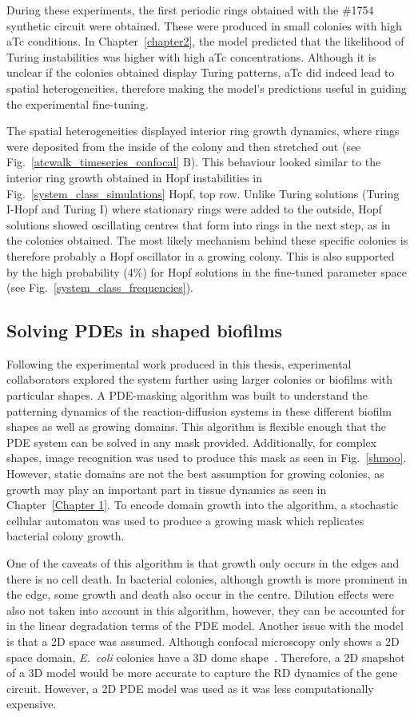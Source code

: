 During these experiments, the first periodic rings obtained with the \#1754 synthetic circuit were obtained.
These were produced in small colonies with high aTc conditions.
In Chapter~\ref{chapter2}, the model predicted that the likelihood of Turing instabilities was higher with high aTc concentrations.
Although it is unclear if the colonies obtained display Turing patterns, aTc did indeed lead to spatial heterogeneities, therefore making the model's predictions useful in guiding the experimental fine-tuning.

The spatial heterogeneities displayed interior ring growth dynamics, where rings were deposited from the inside of the colony and then stretched out (see Fig.~\ref{atcwalk_timeseries_confocal} B).
This behaviour looked similar to the interior ring growth obtained in Hopf instabilities in Fig.~\ref{system_class_simulations} Hopf, top row.
Unlike Turing solutions (Turing I-Hopf and Turing I) where stationary rings were added to the outside, Hopf solutions showed oscillating centres that form into rings in the next step, as in the colonies obtained.
The most likely mechanism behind these specific colonies is therefore probably a Hopf oscillator in a growing colony.
This is also supported by the high probability (4\%) for Hopf solutions in the fine-tuned parameter space (see Fig.~\ref{system_class_frequencies}).

\subsection{Solving PDEs in shaped biofilms}
Following the experimental work produced in this thesis, experimental collaborators explored the system further using larger colonies or biofilms with particular shapes.
A PDE-masking algorithm was built to understand the patterning dynamics of the reaction-diffusion systems in these different biofilm shapes as well as growing domains.
This algorithm is flexible enough that the PDE system can be solved in any mask provided.
Additionally, for complex shapes, image recognition was used to produce this mask as seen in Fig.~\ref{shmoo}.
However, static domains are not the best assumption for growing colonies, as growth may play an important part in tissue dynamics as seen in Chapter~\ref{Chapter 1}.
To encode domain growth into the algorithm, a stochastic cellular automaton was used to produce a growing mask which replicates bacterial colony growth.

One of the caveats of this algorithm is that growth only occurs in the edges and there is no cell death.
In bacterial colonies, although growth is more prominent in the edge, some growth and death also occur in the centre.
Dilution effects were also not taken into account in this algorithm, however, they can be accounted for in the linear degradation terms of the PDE model.
Another issue with the model is that a 2D space was assumed.
Although confocal microscopy only shows a 2D space domain, \textit{E.~coli} colonies have a 3D dome shape~\parencite{wimpenny1979growth}.
Therefore, a 2D snapshot of a 3D model would be more accurate to capture the RD dynamics of the gene circuit.
However, a 2D PDE model was used as it was less computationally expensive.

